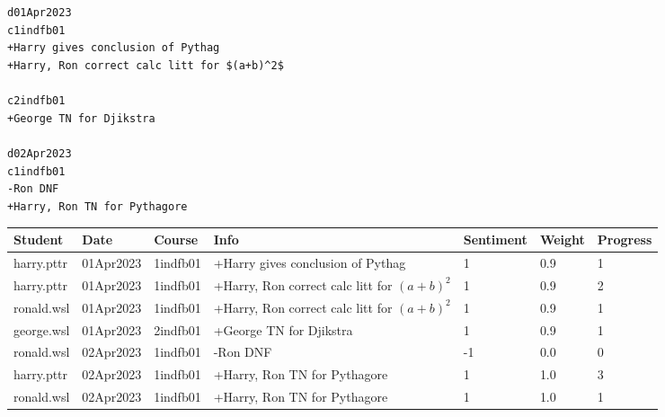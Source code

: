 \documentclass[10pt]{article}
\begin{document}
\begin{landscape}

\begin{tcolorbox}[title = comments\_file\_v1.1.txt]
\texttt{d01Apr2023\\c1indfb01\\+Harry gives conclusion of Pythag\\+Harry, Ron correct calc litt for \$(a+b)\textasciicircum2\$\\\\c2indfb01\\+George TN for Djikstra \\\\ d02Apr2023\\c1indfb01\\-Ron DNF\\+Harry, Ron TN for Pythagore}
\end{tcolorbox}


\begin{tcolorbox}[title = comments\_table\_DataFrame $\subset$ progress\_table\_DataFrame] \label{comments_table}

\begin{tabular}{|l|l|l|l|l||l|l|}
\hline
\textbf{Student} & \textbf{Date} & \textbf{Course} & \textbf{Info}                                                               & \textbf{Sentiment} & \textbf{Weight} & \textbf{Progress} \\ \hline
harry.pttr       & 01Apr2023     & 1indfb01        & +Harry gives conclusion of Pythag                                           & 1                  & 0.9             & 1                 \\ \hline
harry.pttr       & 01Apr2023     & 1indfb01        & +Harry, Ron correct calc litt for $(a+b)^2$ & 1                  & 0.9             & 2                 \\ \hline
ronald.wsl       & 01Apr2023     & 1indfb01        & +Harry, Ron correct calc litt for $(a+b)^2$ & 1                  & 0.9             & 1                 \\ \hline
george.wsl       & 01Apr2023     & 2indfb01        & +George TN for Djikstra                                                     & 1                  & 0.9             & 1                 \\ \hline
ronald.wsl       & 02Apr2023     & 1indfb01        & -Ron DNF                                                                    & -1                 & 0.0             & 0                 \\ \hline
harry.pttr       & 02Apr2023     & 1indfb01        & +Harry, Ron TN for Pythagore                                                & 1                  & 1.0             & 3                 \\ \hline
ronald.wsl       & 02Apr2023     & 1indfb01        & +Harry, Ron TN for Pythagore                                                & 1                  & 1.0             & 1                 \\ \hline
\end{tabular}
\end{tcolorbox}

\end{landscape}
\end{document}

